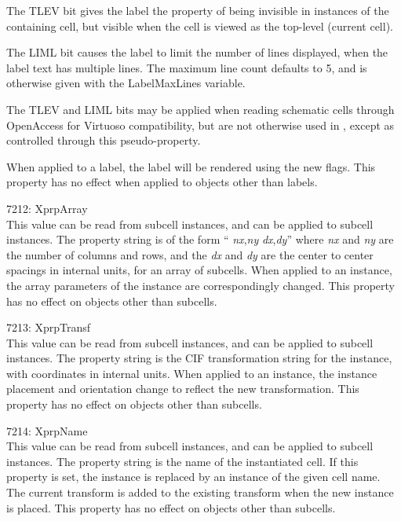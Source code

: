 \begin{description}
The {\vt TLEV} bit gives the label the property of being invisible in
instances of the containing cell, but visible when the cell is viewed
as the top-level (current cell).

The {\vt LIML} bit causes the label to limit the number of lines
displayed, when the label text has multiple lines.  The maximum line
count defaults to 5, and is otherwise given with the {\et
LabelMaxLines} variable.

The {\vt TLEV} and {\vt LIML} bits may be applied when reading
schematic cells through OpenAccess for Virtuoso compatibility, but are
not otherwise used in {\Xic}, except as controlled through this
pseudo-property.

When applied to a label, the label will be rendered using the new flags. 
This property has no effect when applied to objects other than labels.

\item{7212: {\et XprpArray}}\\
This value can be read from subcell instances, and can be applied to
subcell instances.  The property string is of the form ``{\it
nx\/},{\it ny} {\it dx\/},{\it dy}'' where {\it nx} and {\it ny} are
the number of columns and rows, and the {\it dx} and {\it dy} are the
center to center spacings in internal units, for an array of subcells. 
When applied to an instance, the array parameters of the instance are
correspondingly changed.  This property has no effect on objects other
than subcells.

\item{7213: {\et XprpTransf}}\\
This value can be read from subcell instances, and can be applied to
subcell instances.  The property string is the CIF transformation
string for the instance, with coordinates in internal units.  When
applied to an instance, the instance placement and orientation change
to reflect the new transformation.  This property has no effect on
objects other than subcells.

\item{7214: {\et XprpName}}\\
This value can be read from subcell instances, and can be applied to
subcell instances.  The property string is the name of the
instantiated cell.  If this property is set, the instance is replaced
by an instance of the given cell name.  The current transform is added
to the existing transform when the new instance is placed.  This
property has no effect on objects other than subcells.


\end{description}
